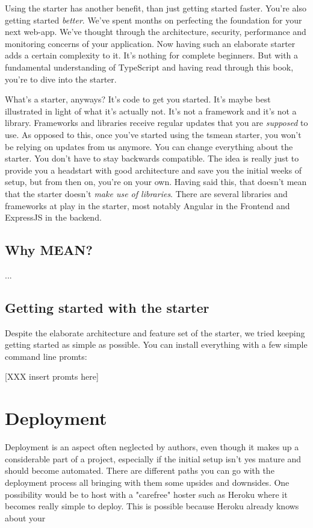 \documentclass[12pt,a4paper]{report}
\begin{document}
Using the starter has another benefit, than just getting started faster. You're also getting started \textit{better}. We've spent months on perfecting the foundation for your next web-app. We've thought through the architecture, security, performance and monitoring concerns of your application. Now having such an elaborate starter adds a certain complexity to it. It's nothing for complete beginners. But with a fundamental understanding of TypeScript and having read through this book, you're to dive into the starter.

What's a starter, anyways? It's code to get you started. It's maybe best illustrated in light of what it's actually not. It's not a framework and it's not a library. Frameworks and libraries receive regular updates that you are \textit{supposed} to use. As opposed to this, once you've started using the tsmean starter, you won't be relying on updates from us anymore. You can change everything about the starter. You don't have to stay backwards compatible. The idea is really just to provide you a headstart with good architecture and save you the initial weeks of setup, but from then on, you're on your own. Having said this, that doesn't mean that the starter doesn't \textit{make use of libraries}. There are several libraries and frameworks at play in the starter, most notably Angular in the Frontend and ExpressJS in the backend.

\section{Why MEAN?}
...

\section {Getting started with the starter}
Despite the elaborate architecture and feature set of the starter, we tried keeping getting started as simple as possible. You can install everything with a few simple command line promts:

[XXX insert promts here]

\chapter{Deployment}

Deployment is an aspect often neglected by authors, even though it makes up a considerable part of a project, especially if the initial setup isn't yes mature and should become automated. There are different paths you can go with the deployment process all bringing with them some upsides and downsides. One possibility would be to host with a "carefree" hoster such as Heroku where it becomes really simple to deploy. This is possible because Heroku already knows about your
\end{document}
